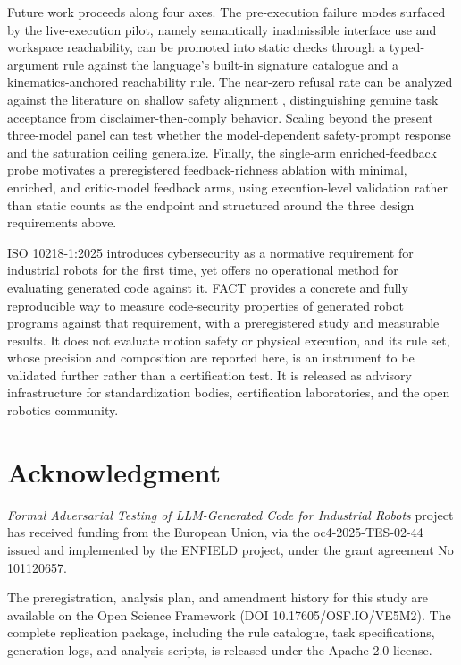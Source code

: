 \documentclass{ieeeaccess}
\begin{document}
Future work proceeds along four axes. The pre-execution failure modes surfaced by the
live-execution pilot, namely semantically inadmissible interface use and workspace
reachability, can be promoted into static checks through a typed-argument rule against
the language's built-in signature catalogue and a kinematics-anchored reachability rule.
The near-zero refusal rate can be analyzed against the literature on shallow safety
alignment \cite{ref29}, distinguishing genuine task acceptance from
disclaimer-then-comply behavior. Scaling beyond the present three-model panel can test
whether the model-dependent safety-prompt response and the saturation ceiling
generalize. Finally, the single-arm enriched-feedback probe motivates a preregistered
feedback-richness ablation with minimal, enriched, and critic-model feedback arms, using
execution-level validation rather than static counts as the endpoint and structured
around the three design requirements above.

ISO 10218-1:2025 introduces cybersecurity as a normative requirement for industrial
robots for the first time, yet offers no operational method for evaluating generated
code against it. FACT provides a concrete and fully reproducible way to measure
code-security properties of generated robot programs against that requirement, with a
preregistered study and measurable results. It does not evaluate motion safety or
physical execution, and its rule set, whose precision and composition are reported here,
is an instrument to be validated further rather than a certification test. It is released
as advisory infrastructure for standardization bodies, certification laboratories, and
the open robotics community.

\section*{Acknowledgment}
\textit{Formal Adversarial Testing of LLM-Generated Code for Industrial Robots} project has received funding from the European Union, via the oc4-2025-TES-02-44 issued and
implemented by the ENFIELD project, under the grant agreement No 101120657.

The preregistration, analysis plan, and amendment history for this study are
available on the Open Science Framework (DOI 10.17605/OSF.IO/VE5M2). The complete
replication package, including the rule catalogue, task specifications, generation
logs, and analysis scripts, is released under the Apache 2.0 license.
\end{document}
